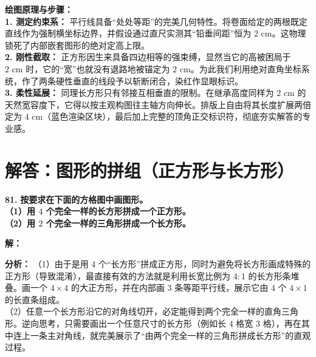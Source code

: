 \vspace{0.4cm}
{\small\color{blue!70!black}
\textbf{绘图原理与步骤：}\\
\textbf{1. 测定约束系：} 平行线具备“处处等距”的完美几何特性。将卷面给定的两根既定直线作为强制横坐标边界，并假设通过直尺实测其“铅垂间距”恒为 $2\text{ cm}$。这物理锁死了内部嵌套图形的绝对定高上限。\\
\textbf{2. 刚性截取：} 正方形因生来具备四边相等的强束缚，显然当它的高被困局于 $2\text{ cm}$ 时，它的“宽”也就没有退路地被锚定为 $2\text{ cm}$。为此我们利用绝对直角坐标系统，作了两条硬性垂直的线段予以斩断闭合，染红作显眼标识。\\
\textbf{3. 柔性延展：} 同理长方形只有邻接互相垂直的限制。在继承高度同样为 $2\text{ cm}$ 的天然宽容度下，它得以按主观构图往主轴方向伸长。排版上自由将其长度扩展两倍定为 $4\text{ cm}$（蓝色渲染区块），最后加上完整的顶角正交标识符，彻底夯实解答的专业感。
}

\newpage



\newpage

\section{解答：图形的拼组（正方形与长方形）}

\vspace{0.6cm}

\textbf{\LARGE 81.} \textbf{按要求在下面的方格图中画图形。\\[1ex]
（1）用 $4$ 个完全一样的长方形拼成一个正方形。\\[1ex]
（2）用 $2$ 个完全一样的三角形拼成一个长方形。}

\vspace{0.4cm}
\textbf{解：}

\textbf{分析：}
（1）由于是用 $4$ 个“长方形”拼成正方形，同时为避免将长方形画成特殊的正方形（导致混淆），最直接有效的方法就是利用长宽比例为 $4:1$ 的长方形条堆叠。画一个 $4 \times 4$ 的大正方形，并在内部画 $3$ 条等距平行线，展示它由 $4$ 个 $4\times 1$ 的长直条组成。\\
（2）任意一个长方形沿它的对角线切开，必定能得到两个完全一样的直角三角形。逆向思考，只需要画出一个任意尺寸的长方形（例如长 $4$ 格宽 $3$ 格），再在其中连上一条主对角线，就完美展示了“由两个完全一样的三角形拼成长方形”的直观过程。


